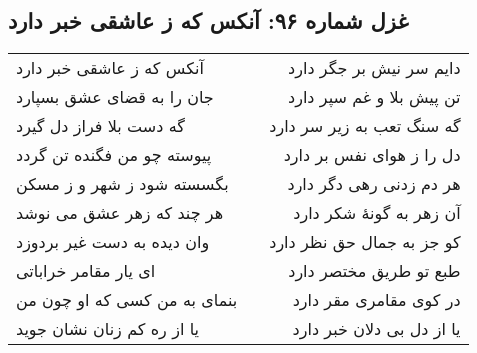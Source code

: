 \begin{center}
\section*{غزل شماره ۹۶: آنکس که ز عاشقی خبر دارد}
\label{sec:096}
\begin{longtable}{l p{0.5cm} r}
آنکس که ز عاشقی خبر دارد
&&
دایم سر نیش بر جگر دارد
\\
جان را به قضای عشق بسپارد
&&
تن پیش بلا و غم سپر دارد
\\
گه دست بلا فراز دل گیرد
&&
گه سنگ تعب به زیر سر دارد
\\
پیوسته چو من فگنده تن گردد
&&
دل را ز هوای نفس بر دارد
\\
بگسسته شود ز شهر و ز مسکن
&&
هر دم زدنی رهی دگر دارد
\\
هر چند که زهر عشق می نوشد
&&
آن زهر به گونهٔ شکر دارد
\\
وان دیده به دست غیر بردوزد
&&
کو جز به جمال حق نظر دارد
\\
ای یار مقامر خراباتی
&&
طبع تو طریق مختصر دارد
\\
بنمای به من کسی که او چون من
&&
در کوی مقامری مقر دارد
\\
یا از ره کم زنان نشان جوید
&&
یا از دل بی دلان خبر دارد
\\
\end{longtable}
\end{center}
